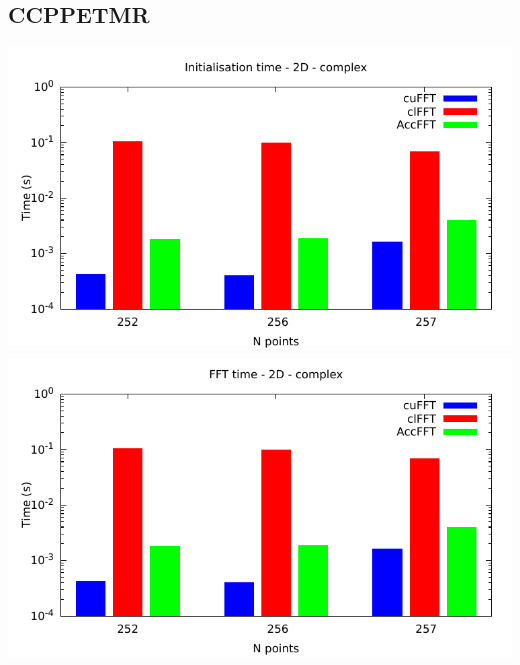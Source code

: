 \documentclass[12pt, a4paper]{article}
\begin{document}
\subsection{CCPPETMR}
\includegraphics[height=8cm]{graphs/fft-ccppetmr-init.pdf}\\
\includegraphics[height=8cm]{graphs/fft-ccppetmr-exec.pdf}\\
\end{document}
